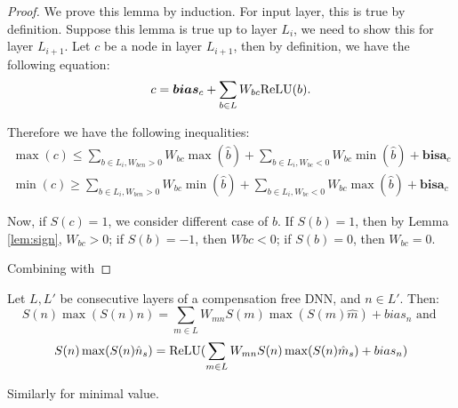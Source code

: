 	\begin{proof}
		We prove this lemma by induction. For input layer, this is true by definition. Suppose this lemma is true up to layer $L_i$, we need to show this for layer $L_{i+1}$. Let $c$ be a node in layer $L_{i+1}$, then by definition, we have the following equation: \begin{align*}
			c = \boldsymbol{bias}_c+\sum_{b\in L}W_{bc}\mathrm{ReLU}(b).
		\end{align*}
		
		Therefore we have the following inequalities:\begin{align*}
				\max(c)\leq\sum_{b \in L_i, W_{bc n}>0}W_{bc} \max(\hat{b}) + \sum_{b \in L_i, W_{bc}<0}W_{bc} \min(\hat{b}) + \boldsymbol{bisa}_c\\
			\min(c)\geq\sum_{b \in L_i, W_{bc n}>0}W_{bc} \min(\hat{b}) + \sum_{b \in L_i, W_{bc}<0}W_{bc} \max(\hat{b}) + \boldsymbol{bisa}_c
		\end{align*}
		
		
		
		
		Now, if $S(c)=1$, we consider different case of $b$. If $S(b)=1$, then by Lemma \ref{lem:sign}, $W_{bc}>0$; if $S(b)=-1$, then $W{bc}<0$; if $S(b)=0$, then $W_{bc}=0$.
		
		Combining with 
		
	\end{proof}
	
	\begin{lemma}
		\label{lemma2}
		Let $L,L'$ be consecutive layers of a compensation free DNN, and $n \in L'$. 
		Then:
		$$ S(n) \max(S(n) n)=\sum_{m \in L}W_{m n} S(m) \max(S(m) \hat{m})+bias_n \text{ and }$$
		$$S(n) \max(S(n)\hat{n}_s)=\mathrm{ReLU}(\sum_{m \in L}W_{m n} S(n)\max(S(n)\hat{m}_s)+bias_n)$$
		
		Similarly for minimal value.
		
		\end{lemma}
		
